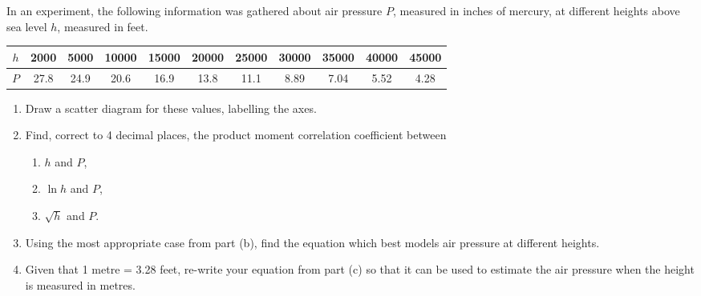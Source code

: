 \begin{problem}
    In an experiment, the following information was gathered about air pressure $P$, measured in inches of mercury, at different heights above sea level $h$, measured in feet.

    \begin{table}[H]
        \centering
        \begin{tabular}{|c|c|c|c|c|c|c|c|c|c|c|}
        \hline
        $h$ & 2000 & 5000 & 10000 & 15000 & 20000 & 25000 & 30000 & 35000 & 40000 & 45000 \\ \hline
        $P$ & 27.8 & 24.9 & 20.6 & 16.9 & 13.8 & 11.1 & 8.89 & 7.04 & 5.52 & 4.28 \\ \hline
        \end{tabular}
    \end{table}

    \begin{enumerate}
        \item Draw a scatter diagram for these values, labelling the axes.
        \item Find, correct to 4 decimal places, the product moment correlation coefficient between
        \begin{enumerate}
            \item $h$ and $P$,
            \item $\ln h$ and $P$,
            \item $\sqrt h$ and $P$.
        \end{enumerate}
        \item Using the most appropriate case from part (b), find the equation which best models air pressure at different heights.
        \item Given that 1 metre = 3.28 feet, re-write your equation from part (c) so that it can be used to estimate the air pressure when the height is measured in metres.
    \end{enumerate}
\end{problem}
